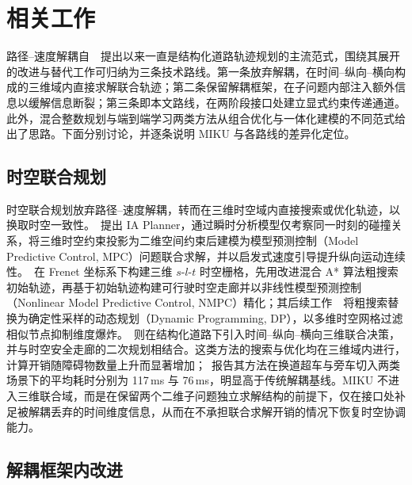 \documentclass[a4paper,11pt]{ctexart}
\theoremstyle{definition}
\begin{document}
\section{相关工作}
\label{sec:related}

路径--速度解耦自~\citet{kant1986pvd}~提出以来一直是结构化道路轨迹规划的主流范式，围绕其展开的改进与替代工作可归纳为三条技术路线。第一条放弃解耦，在时间--纵向--横向构成的三维域内直接求解联合轨迹；第二条保留解耦框架，在子问题内部注入额外信息以缓解信息断裂；第三条即本文路线，在两阶段接口处建立显式约束传递通道。此外，混合整数规划与端到端学习两类方法从组合优化与一体化建模的不同范式给出了思路。下面分别讨论，并逐条说明 MIKU 与各路线的差异化定位。

\subsection{时空联合规划}
\label{sec:related-joint}

时空联合规划放弃路径--速度解耦，转而在三维时空域内直接搜索或优化轨迹，以换取时空一致性。\citet{yang2021_ia_planner}~提出 IA Planner，通过瞬时分析模型仅考察同一时刻的碰撞关系，将三维时空约束投影为二维空间约束后建模为模型预测控制（Model Predictive Control, MPC）问题联合求解，并以启发式速度引导提升纵向运动连续性。\citet{hu2023_hybrid_astar_slt}~在 Frenet 坐标系下构建三维 $s$-$l$-$t$ 时空栅格，先用改进混合 A* 算法粗搜索初始轨迹，再基于初始轨迹构建可行驶时空走廊并以非线性模型预测控制（Nonlinear Model Predictive Control, NMPC）精化；其后续工作~\citep{hu2025_dp_nmpc}~将粗搜索替换为确定性采样的动态规划（Dynamic Programming, DP），以多维时空网格过滤相似节点抑制维度爆炸。\citet{qiao2025stjoint}~则在结构化道路下引入时间--纵向--横向三维联合决策，并与时空安全走廊的二次规划相结合。这类方法的搜索与优化均在三维域内进行，计算开销随障碍物数量上升而显著增加；\citet{hu2023_hybrid_astar_slt}~报告其方法在换道超车与旁车切入两类场景下的平均耗时分别为 117\,ms 与 76\,ms，明显高于传统解耦基线。MIKU 不进入三维联合域，而是在保留两个二维子问题独立求解结构的前提下，仅在接口处补足被解耦丢弃的时间维度信息，从而在不承担联合求解开销的情况下恢复时空协调能力。

\subsection{解耦框架内改进}
\label{sec:related-decoupled}
\end{document}
